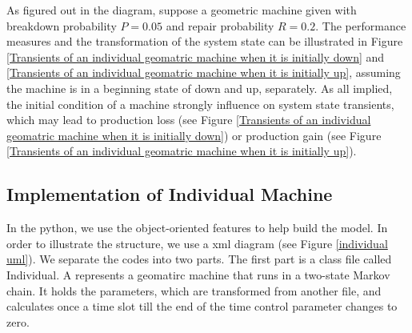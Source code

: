 As figured out in the diagram, suppose a geometric machine given with breakdown probability $P=0.05$ and repair probability $R=0.2$. The performance measures and the transformation of the system state can be illustrated in Figure \ref{Transients of an individual geomatric machine when it is initially down} and \ref{Transients of an individual geomatric machine when it is initially up}, assuming the machine is in a beginning state of down and up, separately. As all implied, the initial condition of a machine strongly influence on system state transients, which may lead to production loss (see Figure \ref{Transients of an individual geomatric machine when it is initially down}) or production gain (see Figure \ref{Transients of an individual geomatric machine when it is initially up}).

\begin{figure*}[!h]
	\centering
	\caption{Transients of an individual geomatric machine when it is initially down}
	\label{Transients of an individual geomatric machine when it is initially down}
\end{figure*}

\begin{figure*}[!h]
	\centering
	\caption{Transients of an individual geomatric machine when it is initially up}
	\label{Transients of an individual geomatric machine when it is initially up}
\end{figure*}

\subsection{Implementation of Individual Machine}
\noindent In the python, we use the object-oriented features to help build the model. In order to illustrate the structure, we use a xml diagram (see Figure \ref{individual uml}). We separate the codes into two parts. The first part is a class file called Individual. A  represents a geomatirc machine that runs in a two-state Markov chain. It holds the parameters, which are transformed from another file, and calculates once a time slot till the end of the time control parameter  changes to zero.

